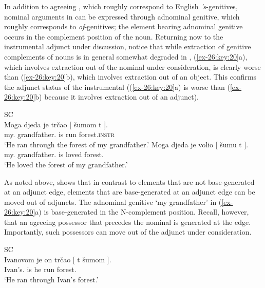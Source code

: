 \documentclass[output=paper]{langsci/langscibook}
\begin{document}
In addition to agreeing , which roughly correspond to English
\emph{'s}-genitives, nominal arguments in  can be expressed through
adnominal genitive, which roughly corresponds to  \emph{of}-genitives;
the element bearing adnominal genitive occurs in the complement position of the
noun. Returning now to the instrumental adjunct under discussion, notice that
while extraction of genitive complements of nouns is in general somewhat
degraded in , (\ref{ex-26:key:20}a), which involves extraction
out of the nominal under consideration, is clearly worse than
(\ref{ex-26:key:20}b), which involves extraction out of an object. This
confirms the adjunct status of the instrumental 
((\ref{ex-26:key:20}a) is worse than (\ref{ex-26:key:20}b) because it involves
extraction out of an adjunct).

\ea\label{ex-26:key:20} \glsdesc{SC}\\
    \ea
        \gll    \llap{*}Moga djeda je trčao [ šumom t ].\\
                my.\Gen{} grandfather.\Gen{} is run {} forest.\textsc{instr}\\
        \glt    \enquote*{He ran through the forest of my grandfather.}
    \ex
        \gll    {}Moga djeda je volio [ šumu t ].\\
                my.\Gen{} grandfather.\Gen{} is loved {} forest.\Acc{}\\
        \glt    \enquote*{He loved the forest of my grandfather.}
	\z
\z

As noted above, \textcite{Boskovic2018} shows that in contrast to elements
that are not base-generated at an adjunct edge, elements that are
base-generated at an adjunct edge can be moved out of adjuncts. The adnominal
genitive \enquote*{my grandfather} in (\ref{ex-26:key:20}a) is base-generated
in the N-complement position.  Recall, however, that an agreeing possessor that
precedes the nominal is generated at the  edge. Importantly,
such possessors can move out of the adjunct under consideration.

\ea\label{ex-26:key:21}\glsdesc{SC}\\
    \gll Ivanovom je on trčao [ t šumom ].\\
            Ivan’s.\Ins{} is he run {} {} forest.\Ins{}\\
	\glt    \enquote*{He ran through Ivan’s forest.}
\z
\end{document}
